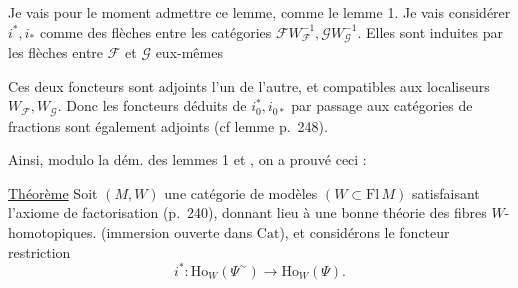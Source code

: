 Je vais pour le moment admettre ce
lemme,  comme le lemme 1. Je vais considérer $i^*,i_*$ comme des flèches entre les catégories $\mathscr F W_{\mathscr F}^{-1},\mathscr G W_{\mathscr G}^{-1}$. Elles sont induites par les flèches
entre $\mathscr F$ et $\mathscr G$ eux-mêmes

Ces deux foncteurs sont adjoints l'un de l'autre, et compatibles aux localiseurs $W_{\mathscr F},W_{\mathscr G}$. Donc les foncteurs  déduits de $i_0^*,i_{0*}$ par passage aux catégories de fractions sont également adjoints (cf lemme p.~248).

Ainsi, modulo la dém. des lemmes 1 et , on a prouvé ceci :

\uline{Théorème} Soit $(M,W)$ une catégorie de modèles $(W\subset\mathrm{Fl}\,M)$ satisfaisant l'axiome de factorisation  (p.~240), donnant  lieu à une bonne théorie des  fibres $W$-homotopiques. 
(immersion ouverte dans $\mathrm{Cat}$), et considérons le foncteur restriction
\[
i^*\colon\mathrm{Ho}_W(\Psi^{\sim})\longrightarrow\mathrm{Ho}_W(\Psi).
\]

